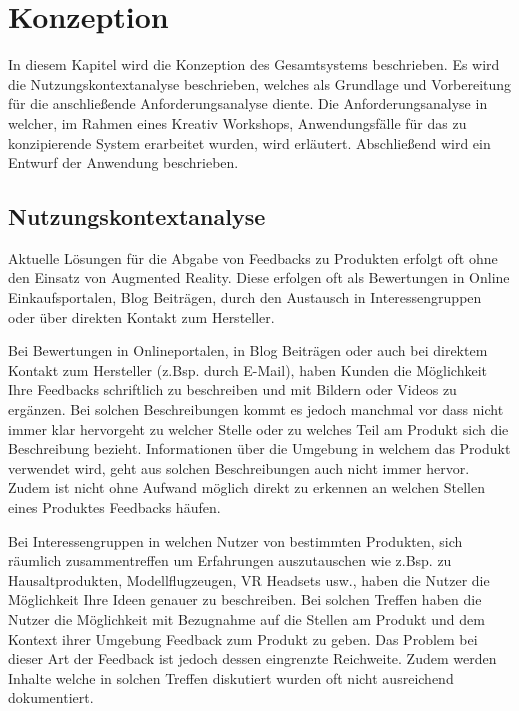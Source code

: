\chapter{Konzeption}

In diesem Kapitel wird die Konzeption des Gesamtsystems beschrieben. Es wird die Nutzungskontextanalyse beschrieben, welches als Grundlage und Vorbereitung für die anschließende Anforderungsanalyse diente. Die Anforderungsanalyse in welcher, im Rahmen eines Kreativ Workshops, Anwendungsfälle für das zu konzipierende System erarbeitet wurden, wird erläutert. Abschließend wird ein Entwurf der Anwendung beschrieben.

\section{Nutzungskontextanalyse}

Aktuelle Lösungen für die Abgabe von Feedbacks zu Produkten erfolgt oft ohne den Einsatz von Augmented Reality. Diese erfolgen 
oft als Bewertungen in Online Einkaufsportalen, Blog Beiträgen, durch den Austausch in Interessengruppen oder über direkten Kontakt zum Hersteller.

Bei Bewertungen in Onlineportalen, in Blog Beiträgen oder auch bei direktem Kontakt zum Hersteller (z.Bsp. durch E-Mail), haben Kunden die Möglichkeit 
Ihre Feedbacks schriftlich zu beschreiben und mit Bildern oder Videos zu ergänzen. Bei solchen Beschreibungen kommt es jedoch manchmal vor dass 
nicht immer klar hervorgeht zu welcher Stelle oder zu welches Teil am Produkt sich die Beschreibung bezieht. Informationen über die Umgebung in welchem das Produkt 
verwendet wird, geht aus solchen Beschreibungen auch nicht immer hervor. Zudem ist nicht ohne Aufwand möglich direkt zu erkennen an welchen Stellen eines Produktes 
Feedbacks häufen.

Bei Interessengruppen in welchen Nutzer von bestimmten Produkten, sich räumlich zusammentreffen um Erfahrungen auszutauschen wie z.Bsp. zu Hausaltprodukten, Modellflugzeugen, VR Headsets usw., 
haben die Nutzer die Möglichkeit Ihre Ideen genauer zu beschreiben. 
Bei solchen Treffen haben die Nutzer die Möglichkeit mit Bezugnahme auf die Stellen am Produkt und dem Kontext ihrer Umgebung Feedback zum Produkt zu geben. 
Das Problem bei dieser Art der Feedback ist jedoch dessen eingrenzte Reichweite. Zudem werden Inhalte welche in solchen Treffen diskutiert wurden oft nicht ausreichend dokumentiert.  

